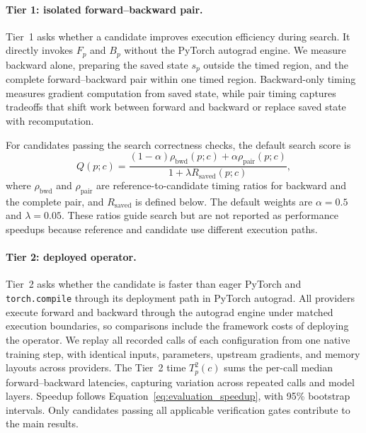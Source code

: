 \paragraph{Tier 1: isolated forward--backward pair.}
Tier~1 asks whether a candidate improves execution efficiency during search. It directly invokes $F_p$ and $B_p$ without the PyTorch autograd engine. We measure backward alone, preparing the saved state $s_p$ outside the timed region, and the complete forward--backward pair within one timed region. Backward-only timing measures gradient computation from saved state, while pair timing captures tradeoffs that shift work between forward and backward or replace saved state with recomputation.

For candidates passing the search correctness checks, the default search score is
\begin{equation}
    Q(p;c)
    =
    \frac{(1-\alpha)\rho_{\mathrm{bwd}}(p;c)
          +\alpha\rho_{\mathrm{pair}}(p;c)}
         {1+\lambda R_{\mathrm{saved}}(p;c)},
    \label{eq:tier1_search_score}
\end{equation}
where $\rho_{\mathrm{bwd}}$ and $\rho_{\mathrm{pair}}$ are reference-to-candidate timing ratios for backward and the complete pair, and $R_{\mathrm{saved}}$ is defined below. The default weights are $\alpha=0.5$ and $\lambda=0.05$. These ratios guide search but are not reported as performance speedups because reference and candidate use different execution paths.

\paragraph{Tier 2: deployed operator.}
Tier~2 asks whether the candidate is faster than eager PyTorch and \texttt{torch.compile} through its deployment path in PyTorch autograd. All providers execute forward and backward through the autograd engine under matched execution boundaries, so comparisons include the framework costs of deploying the operator. We replay all recorded calls of each configuration from one native training step, with identical inputs, parameters, upstream gradients, and memory layouts across providers. The Tier~2 time $T^2_p(c)$ sums the per-call median forward--backward latencies, capturing variation across repeated calls and model layers. Speedup follows Equation~\ref{eq:evaluation_speedup}, with 95\% bootstrap intervals. Only candidates passing all applicable verification gates contribute to the main results.

